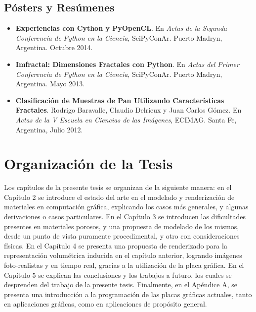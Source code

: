 \subsection*{Pósters y Resúmenes}
\begin{itemize}
\item {\bf Experiencias con Cython y PyOpenCL}. En {\it Actas de la Segunda Conferencia de Python en la Ciencia}, SciPyConAr. Puerto Madryn, Argentina. Octubre 2014.
\item {\bf Imfractal: Dimensiones Fractales con Python}.  En {\it Actas del Primer Conferencia de Python en la Ciencia}, SciPyConAr. Puerto Madryn, Argentina. Mayo 2013.
\item {\bf Clasificación de Muestras de Pan Utilizando Características Fractales}. Rodrigo Baravalle, Claudio Delrieux y Juan Carlos G\'omez. En {\it Actas de la V Escuela en Ciencias de las Imágenes}, ECIMAG. Santa Fe, Argentina, Julio 2012.
\end{itemize}


\section{Organización de la Tesis}
Los capítulos de la presente tesis se organizan de la siguiente manera: en el Capítulo 2 se introduce el estado del arte en el modelado y renderización de materiales en computación gráfica, explicando los casos más generales, y algunas derivaciones o casos particulares.
En el Capítulo 3 se introducen las dificultades presentes en materiales porosos, y una propuesta de modelado de los mismos, desde un punto de vista puramente procedimental, y otro con consideraciones físicas.
En el Capítulo 4 se presenta una propuesta de renderizado para la representación volumétrica inducida en el capítulo anterior, logrando imágenes foto-realistas y en tiempo real, gracias a la utilización de la placa gráfica.
En el Capítulo 5 se explican las conclusiones y los trabajos a futuro, los cuales se desprenden del trabajo de la presente tesis.
Finalmente, en el Apéndice A, se presenta una introducción a la programación de las placas gráficas actuales, tanto en aplicaciones gráficas, como en aplicaciones de propósito general.
